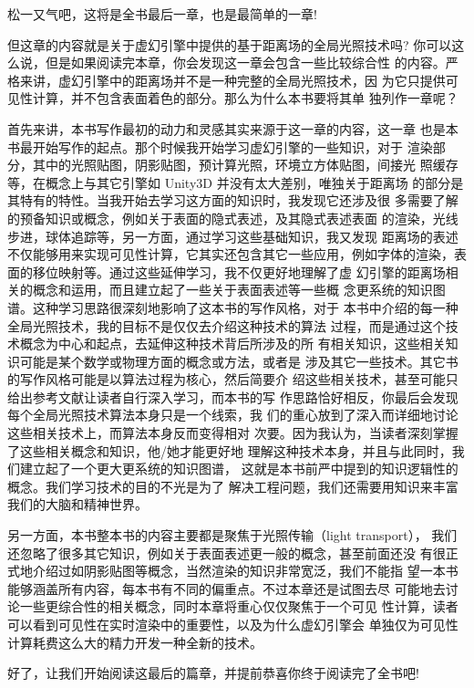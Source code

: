 松一又气吧，这将是全书最后一章，也是最简单的一章!

但这章的内容就是关于虚幻引擎中提供的基于距离场的全局光照技术吗? 你可以这么说，但是如果阅读完本章，你会发现这一章会包含一些比较综合性 的内容。严格来讲，虚幻引擎中的距离场并不是一种完整的全局光照技术，因 为它只提供可见性计算，并不包含表面着色的部分。那么为什么本书要将其单 独列作一章呢？

首先来讲，本书写作最初的动力和灵感其实来源于这一章的内容，这一章 也是本书最开始写作的起点。那个时候我开始学习虚幻引擎的一些知识，对于 渲染部分，其中的光照贴图，阴影贴图，预计算光照，环境立方体贴图，间接光 照缓存等，在概念上与其它引擎如 Unity3D 并没有太大差别，唯独关于距离场 的部分是其特有的特性。当我开始去学习这方面的知识时，我发现它还涉及很 多需要了解的预备知识或概念，例如关于表面的隐式表述，及其隐式表述表面 的渲染，光线步进，球体追踪等，另一方面，通过学习这些基础知识，我又发现 距离场的表述不仅能够用来实现可见性计算，它其实还包含其它一些应用，例如字体的渲染，表面的移位映射等。通过这些延伸学习，我不仅更好地理解了虚 幻引擎的距离场相关的概念和运用，而且建立起了一些关于表面表述等一些概 念更系统的知识图谱。这种学习思路很深刻地影响了这本书的写作风格，对于 本书中介绍的每一种全局光照技术，我的目标不是仅仅去介绍这种技术的算法 过程，而是通过这个技术概念为中心和起点，去延伸这种技术背后所涉及的所 有相关知识，这些相关知识可能是某个数学或物理方面的概念或方法，或者是 涉及其它一些技术。其它书的写作风格可能是以算法过程为核心，然后简要介 绍这些相关技术，甚至可能只给出参考文献让读者自行深入学习，而本书的写 作思路恰好相反，你最后会发现每个全局光照技术算法本身只是一个线索，我 们的重心放到了深入而详细地讨论这些相关技术上，而算法本身反而变得相对 次要。因为我认为，当读者深刻掌握了这些相关概念和知识，他/她才能更好地 理解这种技术本身，并且与此同时，我们建立起了一个更大更系统的知识图谱， 这就是本书前严中提到的知识逻辑性的概念。我们学习技术的目的不光是为了 解决工程问题，我们还需要用知识来丰富我们的大脑和精神世界。

另一方面，本书整本书的内容主要都是聚焦于光照传输（light transport）， 我们还忽略了很多其它知识，例如关于表面表述更一般的概念，甚至前面还没 有很正式地介绍过如阴影贴图等概念，当然渲染的知识非常宽泛，我们不能指 望一本书能够涵盖所有内容，每本书有不同的偏重点。不过本章还是试图去尽 可能地去讨论一些更综合性的相关概念，同时本章将重心仅仅聚焦于一个可见 性计算，读者可以看到可见性在实时渲染中的重要性，以及为什么虚幻引擎会 单独仅为可见性计算耗费这么大的精力开发一种全新的技术。

好了，让我们开始阅读这最后的篇章，并提前恭喜你终于阅读完了全书吧!



